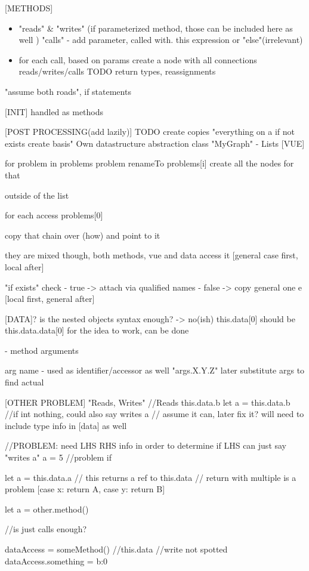 [METHODS]
\begin{itemize}
    \item "reads" & "writes" (if parameterized method, those can be included here as well )
    \items "calls" - add parameter, called with. this expression or "else"(irrelevant)
    \item for each call, based on params create a node with all connections reads/writes/calls
    TODO return types, reassignments 
\end{itemize}

"assume both roads", if statements

[INIT]
handled as methods

[POST PROCESSING(add lazily)]
TODO create copies 
"everything on a if not exists create basis" Own datastructure abstraction class "MyGraph"
- Lists
[VUE]

for problem in problems
problem renameTo problems[i]
create all the nodes for that 


outside of the list

for each access
problems[0]

copy that chain over (how)
and point to it 


they are mixed though, both methods, vue and data access it 
[general case first, local after] 

"if exists" check
 - true -> attach via qualified names 
 - false -> copy general one e  
[local first, general after]

[DATA]? is the nested objects syntax enough? -> no(ish)
this.data[0] should be this.data.data[0] for the idea to work, can be done


- method arguments 

arg name - used as identifier/accessor as well
"args.X.Y.Z" later substitute args to find actual 

[OTHER PROBLEM]
"Reads, Writes"
//Reads this.data.b
let a = this.data.b
//if int nothing, could also say writes a
// assume it can, later fix it? will need to include type info in [data] as well

//PROBLEM: need LHS RHS info in order to determine
if LHS can just say "writes a"
a = 5
//problem if

let a = this.data.a
// this returns a ref to this.data
// return with multiple is a problem [case x: return A, case y: return B]

let a = other.method()

//is just calls enough?


dataAccess = someMethod() //this.data 
//write not spotted
dataAccess.something = {b:0}


